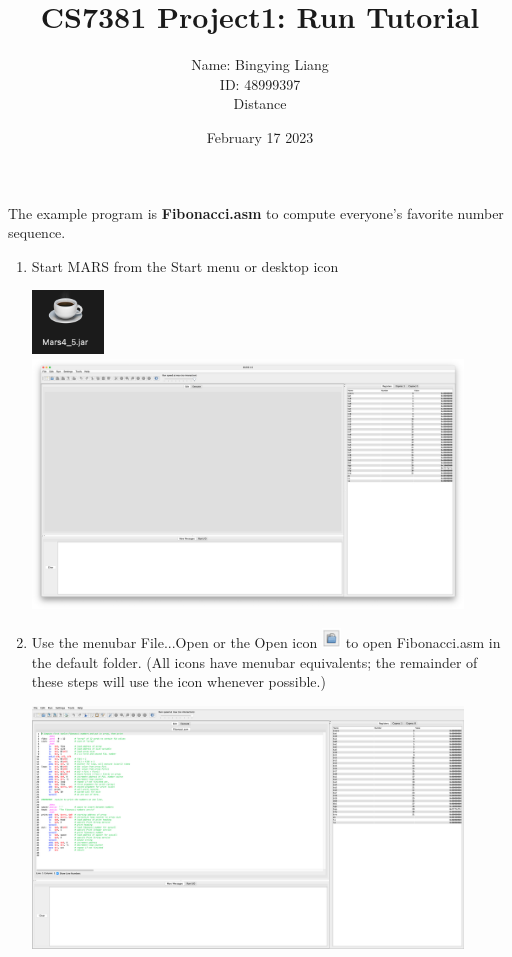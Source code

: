 \documentclass[12pt]{article}
\title{CS7381 Project1: Run Tutorial}
\author{
Name: Bingying Liang \\
ID: 48999397\\  
Distance}
\date{February 17 2023}
\begin{document}
\maketitle
The example program is \textbf{Fibonacci.asm} to compute everyone’s favorite number sequence.
\begin{enumerate}
    \item Start MARS from the Start menu or desktop icon
    \begin{center}
        \includegraphics[width=0.15\textwidth]{1.png} 
        \includegraphics[width=0.9\textwidth]{2.png} 
    \end{center}
    
    \newpage
    \item Use the menubar File...Open or the Open icon \includegraphics[width=0.04\textwidth]{3.png} to open Fibonacci.asm in the default folder. (All icons have menubar equivalents; the remainder of these steps will use the icon whenever possible.)
    \begin{center}
        \includegraphics[width=0.9\textwidth]{4.png} 
    \end{center}
    

\end{enumerate}
\end{document}
